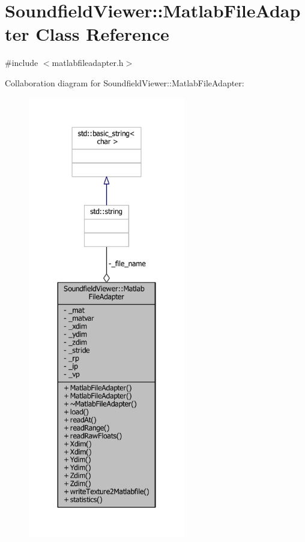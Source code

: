 \section{Soundfield\-Viewer\-:\-:Matlab\-File\-Adapter Class Reference}
\label{classSoundfieldViewer_1_1MatlabFileAdapter}


{\ttfamily \#include $<$matlabfileadapter.\-h$>$}



Collaboration diagram for Soundfield\-Viewer\-:\-:Matlab\-File\-Adapter\-:\nopagebreak
\begin{figure}[H]
\begin{center}
\leavevmode
\includegraphics[height=550pt]{dc/d1b/classSoundfieldViewer_1_1MatlabFileAdapter__coll__graph}
\end{center}
\end{figure}
